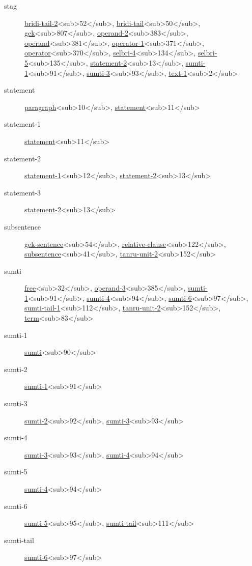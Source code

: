 \begin{description}
\item[stag] \hyperref[html:b52]{bridi-tail-2}<sub>52</sub>, \hyperref[html:b50]{bridi-tail}<sub>50</sub>, \hyperref[html:b807]{gek}<sub>807</sub>, \hyperref[html:b383]{operand-2}<sub>383</sub>, \hyperref[html:b381]{operand}<sub>381</sub>, \hyperref[html:b371]{operator-1}<sub>371</sub>, \hyperref[html:b370]{operator}<sub>370</sub>, \hyperref[html:b134]{selbri-4}<sub>134</sub>, \hyperref[html:b135]{selbri-5}<sub>135</sub>, \hyperref[html:b13]{statement-2}<sub>13</sub>, \hyperref[html:b91]{sumti-1}<sub>91</sub>, \hyperref[html:b93]{sumti-3}<sub>93</sub>, \hyperref[html:b2]{text-1}<sub>2</sub>
\item[statement] \hyperref[html:b10]{paragraph}<sub>10</sub>, \hyperref[html:b11]{statement}<sub>11</sub>
\item[statement-1] \hyperref[html:b11]{statement}<sub>11</sub>
\item[statement-2] \hyperref[html:b12]{statement-1}<sub>12</sub>, \hyperref[html:b13]{statement-2}<sub>13</sub>
\item[statement-3] \hyperref[html:b13]{statement-2}<sub>13</sub>
\item[subsentence] \hyperref[html:b54]{gek-sentence}<sub>54</sub>, \hyperref[html:b122]{relative-clause}<sub>122</sub>, \hyperref[html:b41]{subsentence}<sub>41</sub>, \hyperref[html:b152]{tanru-unit-2}<sub>152</sub>
\item[sumti] \hyperref[html:b32]{free}<sub>32</sub>, \hyperref[html:b385]{operand-3}<sub>385</sub>, \hyperref[html:b91]{sumti-1}<sub>91</sub>, \hyperref[html:b94]{sumti-4}<sub>94</sub>, \hyperref[html:b97]{sumti-6}<sub>97</sub>, \hyperref[html:b112]{sumti-tail-1}<sub>112</sub>, \hyperref[html:b152]{tanru-unit-2}<sub>152</sub>, \hyperref[html:b83]{term}<sub>83</sub>
\item[sumti-1] \hyperref[html:b90]{sumti}<sub>90</sub>
\item[sumti-2] \hyperref[html:b91]{sumti-1}<sub>91</sub>
\item[sumti-3] \hyperref[html:b92]{sumti-2}<sub>92</sub>, \hyperref[html:b93]{sumti-3}<sub>93</sub>
\item[sumti-4] \hyperref[html:b93]{sumti-3}<sub>93</sub>, \hyperref[html:b94]{sumti-4}<sub>94</sub>
\item[sumti-5] \hyperref[html:b94]{sumti-4}<sub>94</sub>
\item[sumti-6] \hyperref[html:b95]{sumti-5}<sub>95</sub>, \hyperref[html:b111]{sumti-tail}<sub>111</sub>
\item[sumti-tail] \hyperref[html:b97]{sumti-6}<sub>97</sub>

\end{description}
